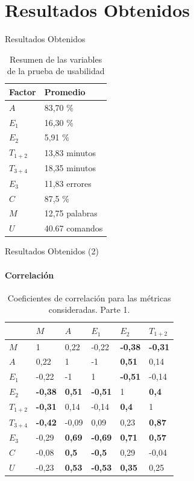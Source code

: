 \section{Resultados Obtenidos}

\begin{frame}{Resultados Obtenidos}

\begin{table}[H]
\centering
\footnotesize
\caption{Resumen de las variables de la prueba de usabilidad}
\begin{tabular}{|p{1.2cm}|p{2cm}|}
\hline
Factor  &   Promedio \\
\hline
$A$  &      83,70 \%     \\
$E_1$ &     16,30 \%  \\
$E_2$  &    5,91  \%  \\
$T_{1+2}$ & 13,83  minutos  \\
$T_{3+4}$ & 18,35  minutos  \\
$E_3$ &     11,83  errores  \\
$C$ &       87,5   \%  \\
$M$ &       12,75  palabras  \\
$U$ &       40.67  comandos  \\
\hline  
\end{tabular}
\label{sec:tabla-resumen-prueba}
\end{table}
\end{frame}

\begin{frame}{Resultados Obtenidos (2)}
\framesubtitle{Correlaci\'on}
\begin{table}[H] 
\centering
\tiny
\caption{Coeficientes de correlaci\'on para las m\'etricas consideradas. Parte 1.}
\begin{tabular}{|p{0.6cm}|p{0.6cm}|p{0.6cm}|p{0.6cm}|p{0.6cm}|p{0.6cm}|}
\hline
&         $M$ &  $A$  &   $E_1$ &  $E_2$  &  $T_{1+2}$ \\
\hline
$M$       &  1              &  0,22  &  -0,22  &  \textbf{-0,38}  &  \textbf{-0,31} \\
$A$       &  0,22           &  1  &  -1  &  \textbf{0,51}  &  0,14 \\
$E_1$     &  -0,22          &  -1  &  1  &  \textbf{-0,51}  &  -0,14 \\
$E_2$     &  \textbf{-0,38} &  \textbf{0,51}  &  \textbf{-0,51}  &  1  &  \textbf{0,4} \\
$T_{1+2}$ &  \textbf{-0,31} &  0,14  &  -0,14  &  \textbf{0,4}  &  1 \\
$T_{3+4}$ &  \textbf{-0,42} &  -0,09  &  0,09  &  0,23  &  \textbf{0,87} \\
$E_3$     &  -0,29          &  \textbf{0,69}  &  \textbf{-0,69}  &  \textbf{0,71}  &  \textbf{0,57} \\
$C$       &  -0,08          &  \textbf{0,5}  &  \textbf{-0,5}  &  0,29  &  -0,04 \\
$U$       &  -0,23          &  \textbf{0,53}  &  \textbf{-0,53}  &  \textbf{0,35}  &  0,25 \\
\hline
\end{tabular}
\label{sec:tabla-correlacion}
\end{table}
\end{frame}

